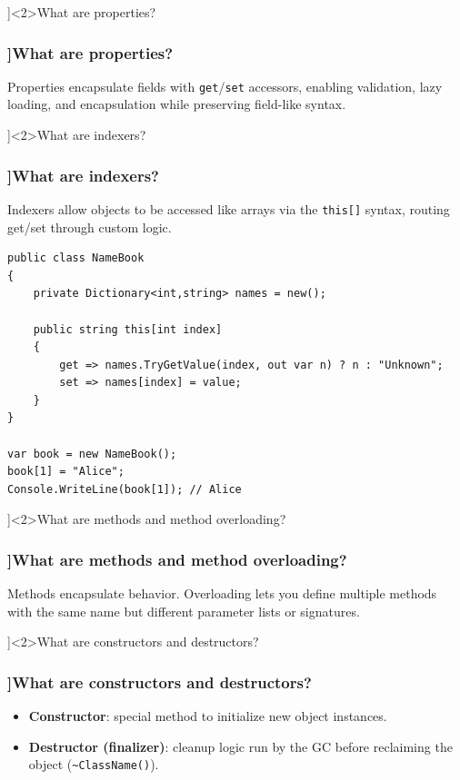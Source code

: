 \QuestionSlide[\CategoryBadge[OOPColor!20]{Language Basics}]<2>{What are properties?}
\begin{frame}[fragile]
  \frametitle{\AnswerTitle[\CategoryBadge[OOPColor!20]{Language Basics}]{What are properties?}}

  {\footnotesize
    Properties encapsulate fields with \texttt{get}/\texttt{set} accessors, enabling validation, lazy loading, and encapsulation while preserving field-like syntax.
  }
\end{frame}

\QuestionSlide[\CategoryBadge[OOPColor!20]{Language Basics}]<2>{What are indexers?}
\begin{frame}[fragile]
  \frametitle{\AnswerTitle[\CategoryBadge[OOPColor!20]{Language Basics}]{What are indexers?}}

  {\footnotesize
    Indexers allow objects to be accessed like arrays via the \texttt{this[]} syntax, routing get/set through custom logic.
  }

  \begin{verbatim}
public class NameBook
{
    private Dictionary<int,string> names = new();

    public string this[int index]
    {
        get => names.TryGetValue(index, out var n) ? n : "Unknown";
        set => names[index] = value;
    }
}

var book = new NameBook();
book[1] = "Alice";
Console.WriteLine(book[1]); // Alice
  \end{verbatim}
\end{frame}

\QuestionSlide[\CategoryBadge[OOPColor!20]{Language Basics}]<2>{What are methods and method overloading?}
\begin{frame}[fragile]
  \frametitle{\AnswerTitle[\CategoryBadge[OOPColor!20]{Language Basics}]{What are methods and method overloading?}}

  {\footnotesize
    Methods encapsulate behavior. Overloading lets you define multiple methods with the same name but different parameter lists or signatures.
  }
\end{frame}

\QuestionSlide[\CategoryBadge[OOPColor!20]{Language Basics}]<2>{What are constructors and destructors?}
\begin{frame}[fragile]
  \frametitle{\AnswerTitle[\CategoryBadge[OOPColor!20]{Language Basics}]{What are constructors and destructors?}}

  {\footnotesize
    \begin{itemize}
      \item \textbf{Constructor}: special method to initialize new object instances.
      \item \textbf{Destructor (finalizer)}: cleanup logic run by the GC before reclaiming the object (\texttt{\textasciitilde ClassName()}).
    \end{itemize}
  }
\end{frame}

